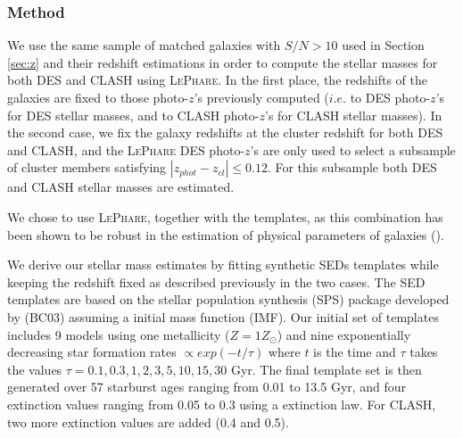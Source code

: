 {\subsubsection{Method}
We use the same sample of matched galaxies with $S/N>10$ used in Section \ref{sec:z} and their redshift estimations in order to compute the stellar masses for both DES and CLASH using \textsc{LePhare}. In the first place, the redshifts of the galaxies are fixed to those photo-$z$'s previously computed ($i.e.$ to DES photo-$z$'s for DES stellar masses, and to CLASH photo-$z$'s for CLASH stellar masses). In the second case, we fix the galaxy redshifts at the cluster redshift for both DES and CLASH, and the \textsc{LePhare} DES photo-$z$'s are only used to select a subsample of cluster members satisfying $|z_{phot}-z_{cl}| \le 0.12$. For this subsample both DES and CLASH stellar masses are estimated.

 We chose to use \textsc{LePhare}, together with the \citet{bc03} templates, as this combination has been shown to be robust in the estimation of physical parameters of galaxies (\citealt{ilbert2010}).

We derive our stellar mass estimates by fitting synthetic SEDs templates while keeping the redshift fixed as described previously in the two cases. The SED templates are based on the stellar population synthesis (SPS) package developed by \citealt{bc03} (BC03) assuming a \citet{chabrier} initial mass function (IMF). Our initial set of templates includes 9 models using one metallicity ($Z=1 Z_\odot$) 
and nine exponentially decreasing star formation rates $\propto exp(-t/\tau)$ where $t$ is the time and $\tau$ takes the values $\tau = 0.1,0.3,1,2,3,5,10,15,30$ Gyr. The final template set is then generated over 57 starburst ages ranging from 0.01 to 13.5 Gyr, and four extinction values ranging from 0.05 to 0.3 using a \citet{calzetti} extinction law. For CLASH, two more extinction values are added (0.4 and 0.5).

}
